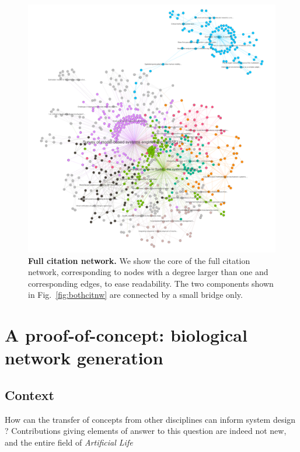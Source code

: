 \documentclass[runningheads,a4paper]{llncs2e/llncs}
\begin{document}
\begin{figure}
	\includegraphics[width=\linewidth]{figures/core.png}
	\caption{\textbf{Full citation network.} We show the core of the full citation network, corresponding to nodes with a degree larger than one and corresponding edges, to ease readability. The two components shown in Fig.~\ref{fig:bothcitnw} are connected by a small bridge only.\label{fig:citnw}}
\end{figure}





\section{A proof-of-concept: biological network generation}


\subsection{Context}

How can the transfer of concepts from other disciplines can inform system design ? Contributions giving elements of answer to this question are indeed not new, and the entire field of \emph{Artificial Life} 

\cite{langton1989artificial}
\end{document}
